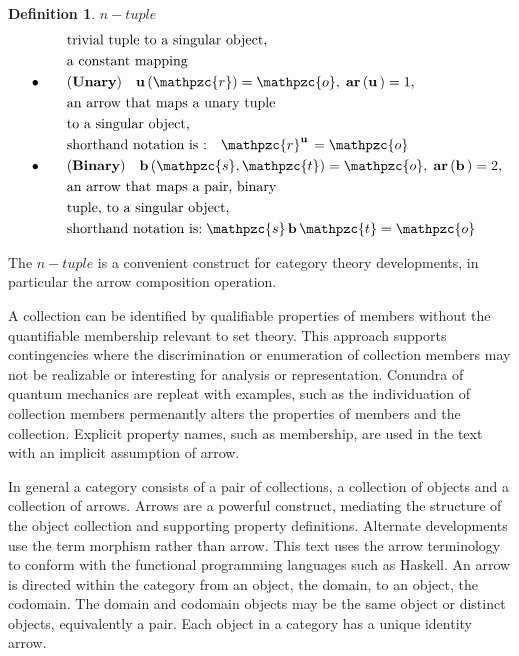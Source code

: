 \documentclass[aps,twocolumn,secnumarabic,nobalancelastpage,amsmath,amssymb,
amsthm,nofootinbib,parskip=full]{revtex4}
\numberwithin{equation}{section}
\newtheorem{definition}{Definition}[section]
\newcommand{\obk}[1]{\mathpzc{#1}}
\newcommand{\oper}[1]{\mathbf{#1}\,}
\newcommand{\cpair}[2]{(\obk{#1},\obk{#2})}
\begin{document}
\begin{definition}{$n-tuple$}
\begin{equation*}
\begin{array}{ll}
                  \quad&\text{trivial tuple to a singular object,} \\[3pt]
                  \quad&\text{a constant mapping} \\[3pt]
      \quad\bullet\quad&\mathbf{(Unary)}\quad\oper{u}(\obk{r})=\obk{o},
                         \;\oper{ar}(\oper{u})=1\text{,} \\[3pt]
                  \quad&\text{an arrow that maps a unary tuple} \\[3pt]
      \quad&\text{to a singular object,} \\[3pt]
      \quad&\text{shorthand notation is :}\quad\obk{r}^{\oper{u}}=\obk{o} \\[3pt]
      \quad\bullet\quad&\mathbf{(Binary)}\quad\oper{b}\cpair{s}{t}=\obk{o},
                         \;\oper{ar}(\oper{b})=2\text{,} \\[3pt]
                  \quad&\text{an arrow that maps a pair, binary} \\[3pt]
                  \quad&\text{tuple, to a singular object,} \\[3pt]
                  \quad&\text{shorthand notation is:}
                                \;\obk{s}\,\oper{b}\obk{t}=\obk{o}
    \end{array}
  \end{equation*}
  
\end{definition}

The $n-tuple$ is a convenient construct for category theory developments,
in particular the arrow composition operation.

A collection can be identified by qualifiable properties of members
without the quantifiable membership relevant to set theory.
This approach supports contingencies where the discrimination
or enumeration of collection members may not be realizable or
interesting for analysis or representation.
Conundra of quantum mechanics are repleat with examples,
such as the individuation of collection members
permenantly alters the properties of members and the collection.
Explicit property names, such as membership,
are used in the text with an implicit assumption of arrow.

In general a category consists of a pair of collections,
a collection of objects and a collection of arrows.
Arrows are a powerful construct, mediating the structure of the
object collection and supporting property definitions. Alternate 
developments use the term morphism rather than arrow.
This text uses the arrow terminology to conform with
the functional programming languages such as Haskell.
An arrow is directed within the category from an object,
the domain, to an object, the codomain.
The domain and codomain objects may be the same
object or distinct objects, equivalently a pair.
Each object in a category has a unique identity arrow.
\end{document}
